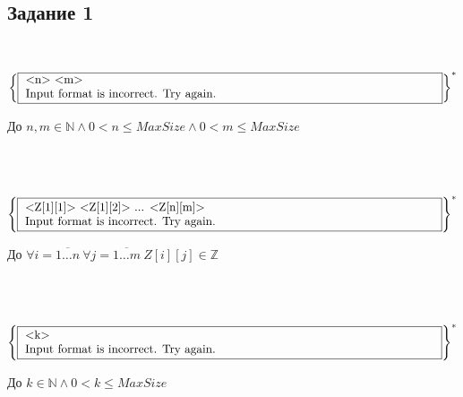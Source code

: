 \subsection*{Задание 1}
\\[0.3cm]
\noindent
\begin{minipage}{0.4\textwidth}
    \(\left\{
        \fbox{
            \parbox{\textwidth} {
                \text{<n> <m>}\\
                \text{Input format is incorrect. Try again.}  
            }
        }
    \right\}^{*}\) 
\end{minipage}%
\hfill
\begin{minipage}{0.5\textwidth}
    До \(n, m \in \mathbb{N} \land 0 < n \leq MaxSize \land 0 < m \leq MaxSize\) 
\end{minipage}%
\\[0.3cm]
\\[0.3cm]
\noindent
\begin{minipage}{0.4\textwidth}
    \(\left\{
        \fbox{
            \parbox{\textwidth} {
                \text{<Z[1][1]> <Z[1][2]> ... <Z[n][m]>}\\
                \text{Input format is incorrect. Try again.}  
            }
        }
    \right\}^{*}\) 
\end{minipage}%
\hfill
\begin{minipage}{0.5\textwidth}
    До \(\forall i = \overline{1 \dots n}\ \forall j = \overline{1 \dots m}\ Z[i][j] \in \mathbb{Z}\) 
\end{minipage}%
\\[0.3cm]
\\[0.3cm]
\noindent
\begin{minipage}{0.4\textwidth}
    \(\left\{
         \fbox{
            \parbox{\textwidth} {
                \text{<k>}\\
                \text{Input format is incorrect. Try again.}  
            }
        }
    \right\}^{*}\) 
\end{minipage}%
\hfill
\begin{minipage}{0.5\textwidth}
    До \(k \in \mathbb{N} \land 0 < k \leq MaxSize\)
\end{minipage}%
